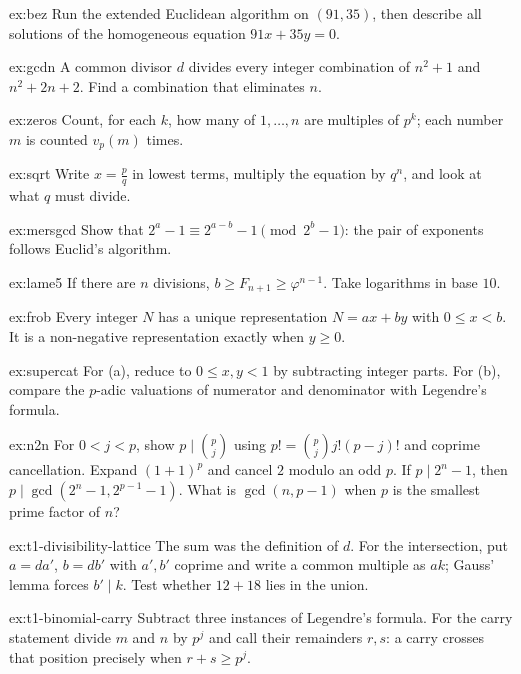 \begin{hint}{ex:bez}
Run the extended Euclidean algorithm on $(91,35)$, then describe all solutions of the homogeneous equation $91x+35y=0$.
\end{hint}
\begin{hint}{ex:gcdn}
A common divisor $d$ divides every integer combination of $n^2+1$ and $n^2+2n+2$. Find a combination that eliminates $n$.
\end{hint}
\begin{hint}{ex:zeros}
Count, for each $k$, how many of $1,\dots,n$ are multiples of $p^k$; each number $m$ is counted $v_p(m)$ times.
\end{hint}
\begin{hint}{ex:sqrt}
Write $x=\frac pq$ in lowest terms, multiply the equation by $q^n$, and look at what $q$ must divide.
\end{hint}
\begin{hint}{ex:mersgcd}
Show that $2^a-1\equiv2^{a-b}-1\pmod{2^b-1}$: the pair of exponents follows Euclid's algorithm.
\end{hint}
\begin{hint}{ex:lame5}
If there are $n$ divisions, $b\ge F_{n+1}\ge\varphi^{n-1}$. Take logarithms in base $10$.
\end{hint}
\begin{hint}{ex:frob}
Every integer $N$ has a unique representation $N=ax+by$ with $0\le x<b$. It is a non-negative representation exactly when $y\ge0$.
\end{hint}
\begin{hint}{ex:supercat}
For (a), reduce to $0\le x,y<1$ by subtracting integer parts. For (b), compare the $p$-adic valuations of numerator and denominator with Legendre's formula.
\end{hint}
\begin{hint}{ex:n2n}
For $0<j<p$, show $p\mid\binom pj$ using $p!=\binom pj j!(p-j)!$ and coprime cancellation. Expand $(1+1)^p$ and cancel $2$ modulo an odd $p$. If $p\mid2^n-1$, then $p\mid\gcd(2^n-1,2^{p-1}-1)$. What is $\gcd(n,p-1)$ when $p$ is the smallest prime factor of $n$?
\end{hint}

\begin{hint}{ex:t1-divisibility-lattice}
The sum was the definition of $d$. For the intersection, put $a=da'$, $b=db'$ with $a',b'$ coprime and write a common multiple as $ak$; Gauss' lemma forces $b'\mid k$. Test whether $12+18$ lies in the union.
\end{hint}
\begin{hint}{ex:t1-binomial-carry}
Subtract three instances of Legendre's formula. For the carry statement divide $m$ and $n$ by $p^j$ and call their remainders $r,s$: a carry crosses that position precisely when $r+s\ge p^j$.
\end{hint}


